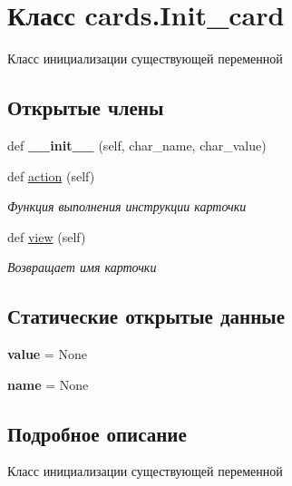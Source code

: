 \hypertarget{classcards_1_1_init__card}{}\section{Класс cards.\+Init\+\_\+card}
\label{classcards_1_1_init__card}


Класс инициализации существующей переменной  


\subsection*{Открытые члены}
\begin{DoxyCompactItemize}
\item 
\mbox{\label{classcards_1_1_init__card_abb97d73013d1db3dd6c5d8b9d1e47406}} 
def {\bfseries \+\_\+\+\_\+init\+\_\+\+\_\+} (self, char\+\_\+name, char\+\_\+value)
\item 
def \mbox{\hyperlink{classcards_1_1_init__card_a04b39655343b2c0b9746afcc2475eed5}{action}} (self)
\begin{DoxyCompactList}\small\item\em Функция выполнения инструкции карточки \end{DoxyCompactList}\item 
def \mbox{\hyperlink{classcards_1_1_init__card_a44f7968662b1ed4c536f96b360f7a2f9}{view}} (self)
\begin{DoxyCompactList}\small\item\em Возвращает имя карточки \end{DoxyCompactList}\end{DoxyCompactItemize}
\subsection*{Статические открытые данные}
\begin{DoxyCompactItemize}
\item 
\mbox{\label{classcards_1_1_init__card_a426f14ce91e6ad45ccb24a0127c0ee7c}} 
{\bfseries value} = None
\item 
\mbox{\label{classcards_1_1_init__card_af15f11e437f0c10143f17e7be65aa76a}} 
{\bfseries name} = None
\end{DoxyCompactItemize}


\subsection{Подробное описание}
Класс инициализации существующей переменной 


